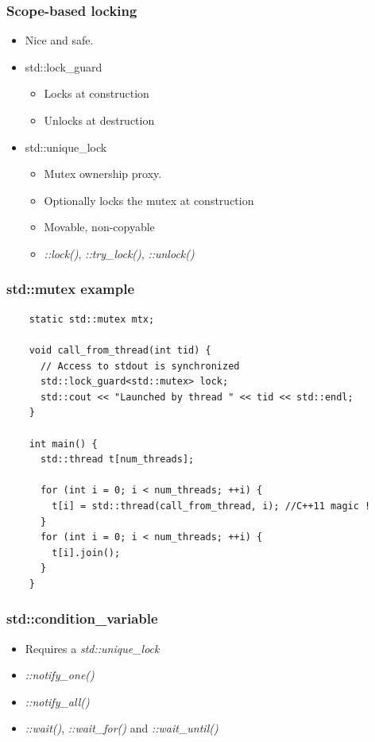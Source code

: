\begin{frame}
  \frametitle{Scope-based locking}

  \begin{itemize}
  \item Nice and safe.
  \item std::lock\_guard
    \begin{itemize}
    \item Locks at construction
    \item Unlocks at destruction
    \end{itemize}
  \item std::unique\_lock
    \begin{itemize}
    \item Mutex ownership proxy.
    \item Optionally locks the mutex at construction
    \item Movable, non-copyable
    \item \emph{::lock()}, \emph{::try\_lock()}, \emph{::unlock()}
    \end{itemize}
  \end{itemize}
\end{frame}


\begin{frame}[fragile]
  \frametitle{std::mutex example}

  \begin{verbatim}
    static std::mutex mtx;

    void call_from_thread(int tid) {
      // Access to stdout is synchronized
      std::lock_guard<std::mutex> lock;
      std::cout << "Launched by thread " << tid << std::endl;
    }

    int main() {
      std::thread t[num_threads];

      for (int i = 0; i < num_threads; ++i) {
        t[i] = std::thread(call_from_thread, i); //C++11 magic !
      }
      for (int i = 0; i < num_threads; ++i) {
        t[i].join();
      }
    }
  \end{verbatim}
\end{frame}


\begin{frame}
  \frametitle{std::condition\_variable}

  \begin{itemize}
  \item Requires a \emph{std::unique\_lock}
  \item \emph{::notify\_one()}
  \item \emph{::notify\_all()}
  \item \emph{::wait()}, \emph{::wait\_for()} and \emph{::wait\_until()}
  \end{itemize}
\end{frame}


